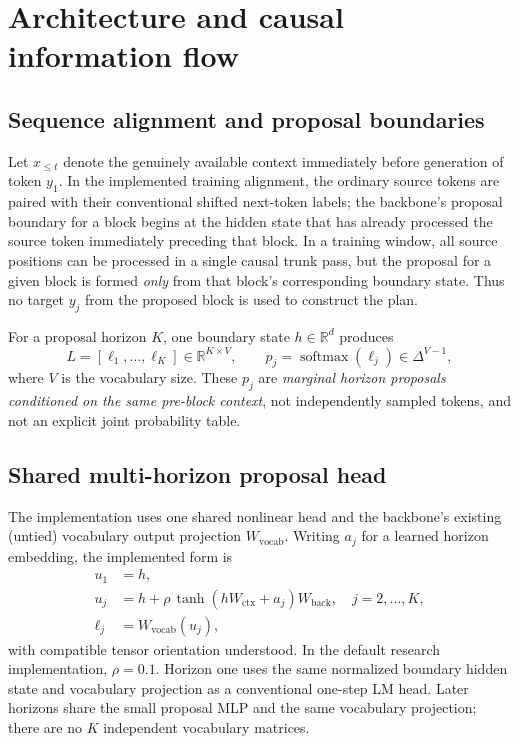 \documentclass[11pt,letterpaper]{article}
\newcommand{\softmax}{\operatorname{softmax}}
\newcommand{\R}{\mathbb{R}}
\begin{document}
\section{Architecture and causal information flow}
\subsection{Sequence alignment and proposal boundaries}
Let $x_{\leq t}$ denote the genuinely available context immediately before generation of token $y_1$. In the implemented training alignment, the ordinary source tokens are paired with their conventional shifted next-token labels; the backbone's proposal boundary for a block begins at the hidden state that has already processed the source token immediately preceding that block. In a training window, all source positions can be processed in a single causal trunk pass, but the proposal for a given block is formed \emph{only} from that block's corresponding boundary state. Thus no target $y_j$ from the proposed block is used to construct the plan.

For a proposal horizon $K$, one boundary state $h\in\R^d$ produces
\begin{equation}
  L=[\ell_1,\ldots,\ell_K]\in\R^{K\times V}, \qquad
  p_j=\softmax(\ell_j)\in\Delta^{V-1},
  \label{eq:proposals}
\end{equation}
where $V$ is the vocabulary size. These $p_j$ are \emph{marginal horizon proposals conditioned on the same pre-block context}, not independently sampled tokens, and not an explicit joint probability table.

\subsection{Shared multi-horizon proposal head}
The implementation uses one shared nonlinear head and the backbone's existing (untied) vocabulary output projection $W_{\mathrm{vocab}}$. Writing $a_j$ for a learned horizon embedding, the implemented form is
\begin{align}
  u_1 &= h, \\
  u_j &= h+\rho\,\tanh(hW_{\mathrm{ctx}}+a_j)W_{\mathrm{back}},\quad j=2,\ldots,K,\\
  \ell_j &= W_{\mathrm{vocab}}(u_j),
  \label{eq:head}
\end{align}
with compatible tensor orientation understood. In the default research implementation, $\rho=0.1$. Horizon one uses the same normalized boundary hidden state and vocabulary projection as a conventional one-step LM head. Later horizons share the small proposal MLP and the same vocabulary projection; there are no $K$ independent vocabulary matrices.
\end{document}

